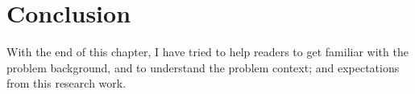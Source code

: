\section{Conclusion}
With the end of this chapter, I have tried to help readers to get familiar with the problem background, and to understand the problem context; and expectations from this research work.








